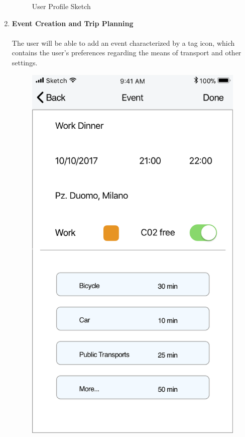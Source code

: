 \begin{enumerate}
\begin{figure}[H]
				\caption{User Profile Sketch}
			\end{figure}
	\item \textbf{Event Creation and Trip Planning}\\
			\vspace{0cm}\\
			The user will be able to add an event characterized by a tag icon, which contains the user’s preferences regarding the means of transport and other settings.
			\begin{figure}[H]
				\centering
				\includegraphics[scale=0.25]{Images/Sketch/Event_Creation_1}

\end{figure}
\end{enumerate}
